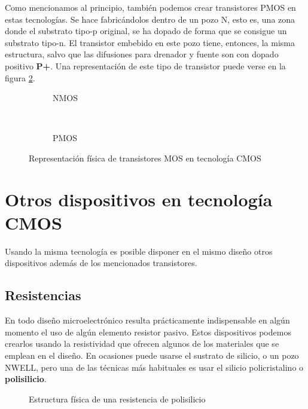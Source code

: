 Como mencionamos al principio, también podemos crear transistores PMOS en estas
tecnologías. Se hace fabricándolos dentro de un pozo N, esto es, una zona
donde el substrato tipo-p original, se ha dopado de forma que se consigue un substrato
tipo-n. El transistor embebido en este pozo tiene, entonces, la misma estructura,
salvo que las difusiones para drenador y fuente son con dopado positivo \textbf{P+}.
Una representación de este tipo de transistor puede verse en la figura \ref{fig:pmos}.\\

\begin{figure}[h]
	\centering
	\begin{subfigure}{0.45\textwidth}
		
		\caption{NMOS}
		\label{fig:nmos}
	\end{subfigure}
	~ %
	\begin{subfigure}{0.45\textwidth}
		
		\caption{PMOS}
		\label{fig:pmos}
	\end{subfigure}
	\caption{Representación física de transistores MOS en tecnología CMOS}
	\label{fig:cmos_transistors}
\end{figure}

\section{Otros dispositivos en tecnología CMOS}\label{cap:otros_dispositivos}

Usando la misma tecnología es posible disponer en el mismo diseño otros dispositivos
además de los mencionados transistores.\\

\subsection{Resistencias}
En todo diseño microelectrónico resulta prácticamente indispensable en algún
momento el uso de algún elemento resistor pasivo. Estos dispositivos podemos
crearlos usando la resistividad que ofrecen algunos de los materiales que se emplean
en el diseño. En ocasiones puede usarse el sustrato de silicio, o un pozo NWELL, pero
una de las técnicas más habituales es usar el silicio policristalino o \textbf{polisilicio}.\\

\begin{figure}[h]
	\centering
	
	\caption{Estructura física de una resistencia de polisilicio}
	\label{fig:poly_res}
\end{figure}

